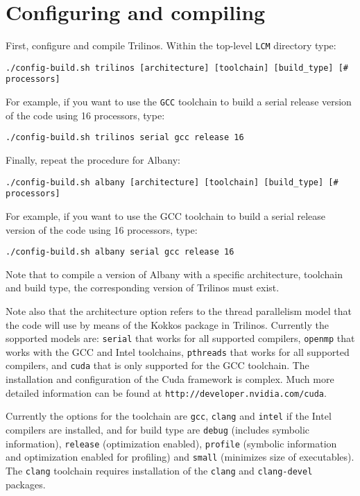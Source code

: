 \documentclass[10pt,a4paper]{article} \usepackage[utf8]{inputenc}
\begin{document}
\section{Configuring and compiling}
First, configure and compile Trilinos. Within the top-level \verb+LCM+
directory type:
\begin{verbatim}
./config-build.sh trilinos [architecture] [toolchain] [build_type] [# processors]
\end{verbatim}

For example, if you want to use the \verb+GCC+ toolchain to build a
serial release version of the code using 16 processors, type:
\begin{verbatim}
./config-build.sh trilinos serial gcc release 16
\end{verbatim}

Finally, repeat the procedure for Albany:
\begin{verbatim}
./config-build.sh albany [architecture] [toolchain] [build_type] [# processors]
\end{verbatim}

For example, if you want to use the GCC toolchain to build a
serial release version of the code using 16 processors, type:
\begin{verbatim}
./config-build.sh albany serial gcc release 16
\end{verbatim}

Note that to compile a version of Albany with a specific architecture,
toolchain and build type, the corresponding version of Trilinos must
exist.

Note also that the architecture option refers to the thread
parallelism model that the code will use by means of the Kokkos
package in Trilinos. Currently the sopported models are: \verb+serial+
that works for all supported compilers, \verb+openmp+ that works with
the GCC and Intel toolchains, \verb+pthreads+ that works for all
supported compilers, and \verb+cuda+ that is only supported for the
GCC toolchain. The installation and configuration of the Cuda
framework is complex. Much more detailed information can be found at
\verb+http://developer.nvidia.com/cuda+.

Currently the options for the toolchain are \verb+gcc+, \verb+clang+
and \verb+intel+ if the Intel compilers are installed, and for build
type are \verb+debug+ (includes symbolic information), \verb+release+
(optimization enabled), \verb+profile+ (symbolic information and
optimization enabled for profiling) and \verb+small+ (minimizes size
of executables). The \verb+clang+ toolchain requires installation of
the \verb+clang+ and \verb+clang-devel+ packages.
\end{document}
